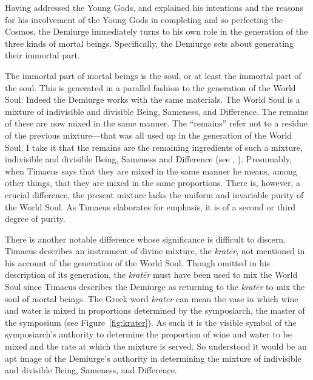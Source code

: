 Having addressed the Young Gods, and explained his intentions and the reasons for his involvement of the Young Gods in completing and so perfecting the Cosmos, the Demiurge immediately turns to his own role in the generation of the three kinds of mortal beings. Specifically, the Demiurge sets about generating their immortal part. 

The immortal part of mortal beings is the soul, or at least the immortal part of the soul. This is generated in a parallel fashion to the generation of the World Soul. Indeed the Demiurge works with the same materials. The World Soul is a mixture of indivisible and divisible Being, Sameness, and Difference. The remains of these are now mixed in the same manner. The ``remains'' refer not to a residue of the previous mixture---that was all used up in the generation of the World Soul. I take it that the remains are the remaining ingredients of such a mixture, indivisible and divisible Being, Sameness and Difference (see \citealt[141 n10]{Archer-Hind:1888qd}, \citealt[255]{Taylor:1928qb}). Presumably, when Timaeus says that they are mixed in the same manner he means, among other things, that they are mixed in the same proportions. There is, however, a crucial difference, the present mixture lacks the uniform and invariable purity of the World Soul. As Timaeus elaborates for emphasis, it is of a second or third degree of purity. 

There is another notable difference whose significance is difficult to discern. Timae\-us describes an instrument of divine mixture, the \emph{kratēr}, not mentioned in his account of the generation of the World Soul. Though omitted in his description of its generation, the \emph{kratēr} must have been used to mix the World Soul since Timaeus describes the Demiurge as returning to the \emph{kratēr} to mix the soul of mortal beings. The Greek word \emph{kratēr} can mean the vase in which wine and water is mixed in proportions determined by the symposiarch, the master of the symposium (see Figure~\ref{fig:krater}). As such it is the visible symbol of the symposiarch's authority to determine the proportion of wine and water to be mixed and the rate at which the mixture is served. So understood it would be an apt image of the Demiurge's authority in determining the mixture of indivisible and divisible Being, Sameness, and Difference. 

